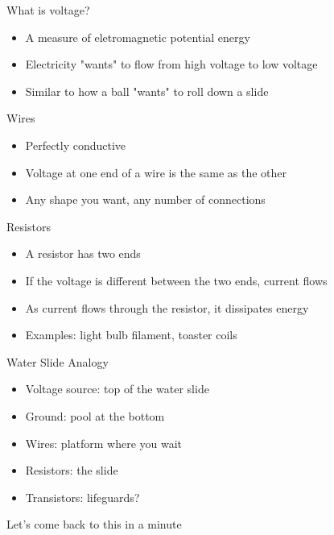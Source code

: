 \begin{frame}{What is voltage?}
	\begin{itemize}
		\item A measure of eletromagnetic potential energy
		\item Electricity "wants" to flow from high voltage to low voltage
		\item Similar to how a ball "wants" to roll down a slide
	\end{itemize}
\end{frame}

\begin{frame}{Wires}
	\begin{itemize}
		\item Perfectly conductive
		\item Voltage at one end of a wire is the same as the other
		\item Any shape you want, any number of connections
	\end{itemize}
\end{frame}


\begin{frame}{Resistors}
	\begin{itemize}
		\item A resistor has two ends
		\item If the voltage is different between the two ends, current flows
		\item As current flows through the resistor, it dissipates energy
		\item Examples: light bulb filament, toaster coils
	\end{itemize}
\end{frame}


\begin{frame}{Water Slide Analogy}
	\begin{itemize}
		\item Voltage source: top of the water slide
		\item Ground: pool at the bottom
		\item Wires: platform where you wait
		\item Resistors: the slide
		\item Transistors: lifeguards?
	\end{itemize}

	Let's come back to this in a minute

\end{frame}


